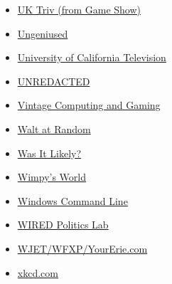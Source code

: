 \begin{itemize}
\item
  \href{https://www.theincomparable.com/gameshow/uktriv/}{UK Triv (from
  Game Show)}
\item
  \href{https://www.relay.fm/ungeniused}{Ungeniused}
\item
  \href{http://www.uctv.tv}{University of California Television}
\item
  \href{https://unredacted.com/}{UNREDACTED}
\item
  \href{https://www.vintagecomputing.com/}{Vintage Computing and Gaming}
\item
  \href{https://walt.lishost.org/}{Walt at Random}
\item
  \href{https://wasitlikely.blogspot.com/}{Was It Likely?}
\item
  \href{https://wimpysworld.com/}{Wimpy's World}
\item
  \href{https://devblogs.microsoft.com/commandline/}{Windows Command
  Line}
\item
  \href{https://www.wired.com/}{WIRED Politics Lab}
\item
  \href{https://www.yourerie.com/}{WJET/WFXP/YourErie.com}
\item
  \href{https://xkcd.com/}{xkcd.com}
\end{itemize}
